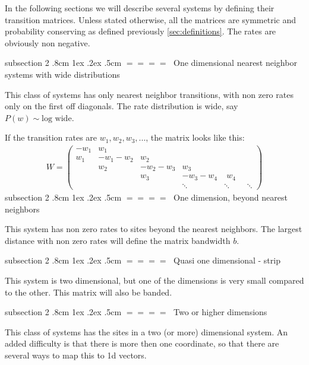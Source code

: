 \documentclass[onecolumn,fleqn,notitlepage,secnumarabic]{revtex4}
\makeatletter
\def\subsection{%
  \@startsection
    {subsection}%
    {2}%
    {\z@}%
    {.8cm \@plus1ex \@minus .2ex}%
    {.5cm}%
    {\normalfont\small\bfseries$=\!=\!=\!=\;$}%
}%
\makeatother
\begin{document}
In the following sections we will describe several systems by defining their transition matrices. Unless stated otherwise, all the matrices are symmetric and probability conserving as defined previously \ref{sec:definitions}. The rates are obviously non negative.

\subsection{One dimensional nearest neighbor systems with wide distributions}

This class of systems has only nearest neighbor transitions, with non zero rates only on the first off diagonals. The rate distribution is wide, say $P(w) \sim \textrm{log wide}$.


If the transition rates are $w_1,w_2,w_3,...$, the matrix looks like this:
\begin{align}
W = 
\begin{pmatrix}
-w_1  & w_1 \\
w_1  & -w_1-w_2 &  w_2 \\
 & w_2 & -w_2-w_3 &  w_3 \\
& & w_3 & -w_3-w_4 & \; w_4 \\
& & & \ddots &\ddots&\;\;\ddots
\end{pmatrix}
\end{align}
\subsection{One dimension, beyond nearest neighbors}

This system has non zero rates to sites beyond the nearest neighbors. The largest distance with non zero rates will define the matrix bandwidth $b$.

\subsection{Quasi one dimensional - strip}

This system is two dimensional, but one of the dimensions is very small compared to the other. This matrix will also be banded.

\subsection{Two or higher dimensions}

This class of systems has the sites in a two (or more) dimensional system. An added difficulty is that there is more then one coordinate, so that there are several ways to map this to 1d vectors.
\end{document}
